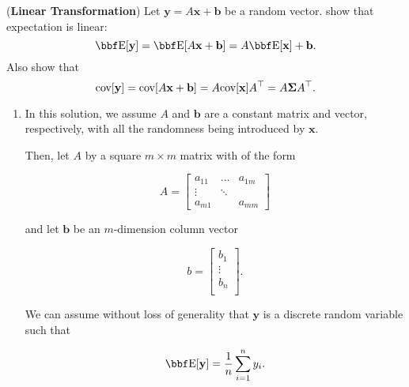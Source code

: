 \documentclass[12pt,letterpaper]{hmcpset}
\begin{document}
\begin{problem}[1]
(\textbf{Linear Transformation}) Let $\mathbf{y} = A\mathbf{x} + \mathbf{b}$ be a random vector.
show that expectation is linear:
\[
    \EE[\yy] = \EE[A\xx + \bb] = A\EE[\xx] + \bb.
\]
Also show that
\[
    {\hbox{cov}}[{\bf y}] = {\hbox{cov}}[A{\bf x} + {\bf b}] = A {\hbox{cov}}[{\bf x}] A^\top = A\hbox{\boldmath$\Sigma$} A^\top.
\]
\end{problem}
\begin{solution}
\begin{enumerate}

\item
In this solution, we assume $A$ and $\mathbf{b}$ are a constant matrix and vector, respectively, with all the randomness being introduced by $\mathbf{x}$.

Then, let $A$ by a square $m \times m $ matrix with of the form

\[
A = \begin{bmatrix} 
    a_{11} & \dots & a_{1m} \\
    \vdots & \ddots & \\
    a_{m1} &        & a_{mm} 
    \end{bmatrix}
\]

and let $\mathbf{b}$ be an $m$-dimension column vector
    
   \[
b=
  \begin{bmatrix}
    b_{1} \\
    \vdots \\
    b_{n} \\
  \end{bmatrix}.
\]

We can assume without loss of generality that $\mathbf{y}$ is a discrete random variable such that
 
\[
\EE[\yy] = \frac{1}{n} \sum_{i=1}^{n} y_i .
\]


\end{enumerate}
\end{solution}
\end{document}
